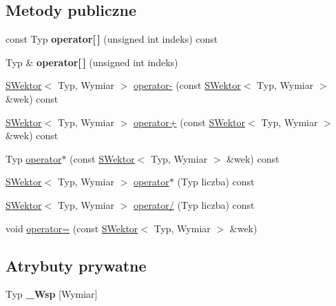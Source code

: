 \subsection*{Metody publiczne}
\begin{DoxyCompactItemize}
\item 
\mbox{\label{classSWektor_a30dfcfc08257aeeb41bc96c32704f431}} 
const Typ {\bfseries operator\mbox{[}$\,$\mbox{]}} (unsigned int indeks) const
\item 
\mbox{\label{classSWektor_a39a12c33739ea481b627f2eaea3c4658}} 
Typ \& {\bfseries operator\mbox{[}$\,$\mbox{]}} (unsigned int indeks)
\item 
\hyperlink{classSWektor}{S\+Wektor}$<$ Typ, Wymiar $>$ \hyperlink{classSWektor_ad6edecba069a5fa43685eae4de64126a}{operator-\/} (const \hyperlink{classSWektor}{S\+Wektor}$<$ Typ, Wymiar $>$ \&wek) const
\item 
\hyperlink{classSWektor}{S\+Wektor}$<$ Typ, Wymiar $>$ \hyperlink{classSWektor_a088f294837df1f61cb577c26646ba76a}{operator+} (const \hyperlink{classSWektor}{S\+Wektor}$<$ Typ, Wymiar $>$ \&wek) const
\item 
Typ \hyperlink{classSWektor_a216a89c4fa018c75ae11af6e0cf26b23}{operator$\ast$} (const \hyperlink{classSWektor}{S\+Wektor}$<$ Typ, Wymiar $>$ \&wek) const
\item 
\hyperlink{classSWektor}{S\+Wektor}$<$ Typ, Wymiar $>$ \hyperlink{classSWektor_a58efd989f2647747bcc68e9650e38647}{operator$\ast$} (Typ liczba) const
\item 
\hyperlink{classSWektor}{S\+Wektor}$<$ Typ, Wymiar $>$ \hyperlink{classSWektor_a80fde5a5dca1d5b261bda6c4da826134}{operator/} (Typ liczba) const
\item 
void \hyperlink{classSWektor_a03255e5b60c400972aad2a56f06832c4}{operator=} (const \hyperlink{classSWektor}{S\+Wektor}$<$ Typ, Wymiar $>$ \&wek)
\end{DoxyCompactItemize}
\subsection*{Atrybuty prywatne}
\begin{DoxyCompactItemize}
\item 
\mbox{\label{classSWektor_a5b623317072fcf2d05ece0e30a819c81}} 
Typ {\bfseries \+\_\+\+Wsp} \mbox{[}Wymiar\mbox{]}
\end{DoxyCompactItemize}


